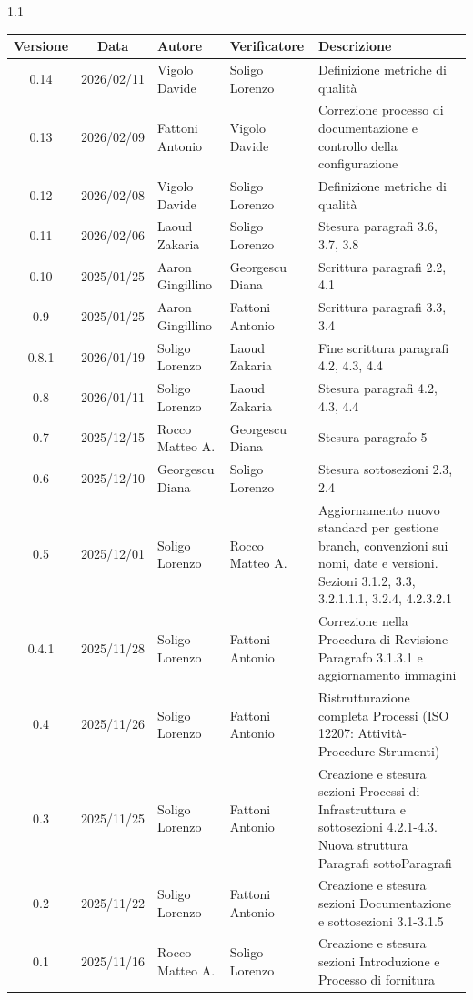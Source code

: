 \documentclass[a4paper,12pt]{article}
\begin{document}
\begin{spacing}{1.1}
\begin{longtable}{|c|c|p{3.2cm}|p{3.2cm}|p{5cm}|}
    \hline
    \textbf{Versione} & \textbf{Data} & \textbf{Autore} & \textbf{Verificatore} & \textbf{Descrizione} \\
    \hline
    0.14 & 2026/02/11 & Vigolo Davide & Soligo Lorenzo & Definizione metriche di qualità \\
    \hline
    0.13 & 2026/02/09 & Fattoni Antonio & Vigolo Davide & Correzione processo di documentazione e controllo della configurazione \\
    \hline
    0.12 & 2026/02/08 & Vigolo Davide & Soligo Lorenzo & Definizione metriche di qualità \\
    \hline
    0.11 & 2026/02/06 & Laoud Zakaria & Soligo Lorenzo & Stesura paragrafi 3.6, 3.7, 3.8 \\
    \hline
    0.10 & 2025/01/25 & Aaron Gingillino & Georgescu Diana & Scrittura paragrafi 2.2, 4.1 \\
    \hline
    0.9 & 2025/01/25 & Aaron Gingillino & Fattoni Antonio & Scrittura paragrafi 3.3, 3.4 \\
    \hline
    0.8.1 & 2026/01/19 & Soligo Lorenzo & Laoud Zakaria & Fine scrittura paragrafi 4.2, 4.3, 4.4 \\
    \hline
    0.8 & 2026/01/11 & Soligo Lorenzo & Laoud Zakaria & Stesura paragrafi 4.2, 4.3, 4.4 \\
    \hline
    0.7 & 2025/12/15 & Rocco Matteo A. & Georgescu Diana & Stesura paragrafo 5 \\
    \hline
    0.6 & 2025/12/10 & Georgescu Diana & Soligo Lorenzo & Stesura sottosezioni 2.3, 2.4 \\
    \hline
    0.5 & 2025/12/01 & Soligo Lorenzo & Rocco Matteo A. & Aggiornamento nuovo standard per gestione branch, convenzioni sui nomi, date e versioni. Sezioni 3.1.2, 3.3, 3.2.1.1.1, 3.2.4, 4.2.3.2.1 \\
    \hline
    0.4.1 & 2025/11/28 & Soligo Lorenzo & Fattoni Antonio & Correzione nella Procedura di Revisione Paragrafo 3.1.3.1 e aggiornamento immagini \\
    \hline
    0.4 & 2025/11/26 & Soligo Lorenzo & Fattoni Antonio & Ristrutturazione completa Processi (ISO 12207: Attività-Procedure-Strumenti) \\
    \hline
    0.3 & 2025/11/25 & Soligo Lorenzo & Fattoni Antonio & Creazione e stesura sezioni Processi di Infrastruttura e sottosezioni 4.2.1-4.3. Nuova struttura Paragrafi sottoParagrafi \\
    \hline
    0.2 & 2025/11/22 & Soligo Lorenzo & Fattoni Antonio & Creazione e stesura sezioni Documentazione e sottosezioni 3.1-3.1.5 \\
    \hline
    0.1 & 2025/11/16 & Rocco Matteo A. & Soligo Lorenzo & Creazione e stesura sezioni Introduzione e Processo di fornitura \\
    \hline
\end{longtable}
\end{spacing}
\newpage
\end{document}
